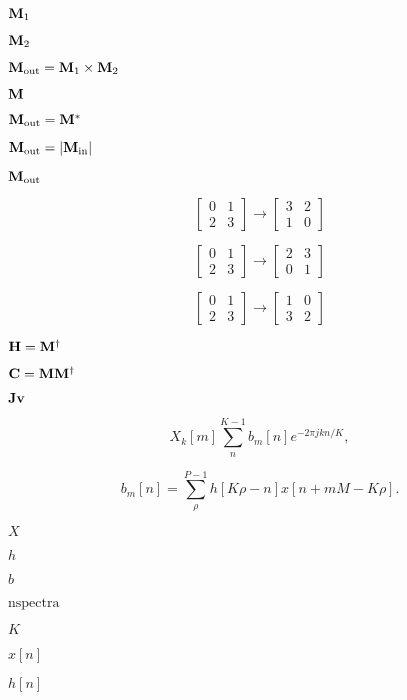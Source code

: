 \documentclass{article}
\begin{document}
${\bf M}_1$
\pagebreak

${\bf M}_2$
\pagebreak

${\bf M}_\text{out} = {\bf M}_1 \times {\bf M}_2$
\pagebreak

${\bf M}$
\pagebreak

${\bf M}_\text{out} = {\bf M}^\ast$
\pagebreak

${\bf M}_\text{out} = |{\bf M}_\text{in}|$
\pagebreak

${\bf M}_\text{out}$
\pagebreak

\[\begin{bmatrix} 0 & 1 \\ 2 & 3\end{bmatrix} \rightarrow \begin{bmatrix} 3 & 2 \\ 1 & 0 \end{bmatrix}\]
\pagebreak

\[\begin{bmatrix} 0 & 1 \\ 2 & 3\end{bmatrix} \rightarrow \begin{bmatrix} 2 & 3 \\ 0 & 1 \end{bmatrix}\]
\pagebreak

\[\begin{bmatrix} 0 & 1 \\ 2 & 3\end{bmatrix} \rightarrow \begin{bmatrix} 1 & 0 \\ 3 & 2 \end{bmatrix}\]
\pagebreak

${\bf H} = {\bf M}^\dagger$
\pagebreak

${\bf C} = {\bf M}{\bf M}^\dagger$
\pagebreak

${\bf J}{\bf v}$
\pagebreak

\[ X_k[m] \sum_n^{K-1} b_m[n] e^{-2\pi jkn/K}, \]
\pagebreak

\[ b_m[n] = \sum_\rho^{P-1} h[K\rho - n] x[n + mM - K\rho]. \]
\pagebreak

$X$
\pagebreak

$h$
\pagebreak

$b$
\pagebreak

$\text{nspectra}$
\pagebreak

$K$
\pagebreak

$x[n]$
\pagebreak

$h[n]$
\pagebreak
\end{document}
